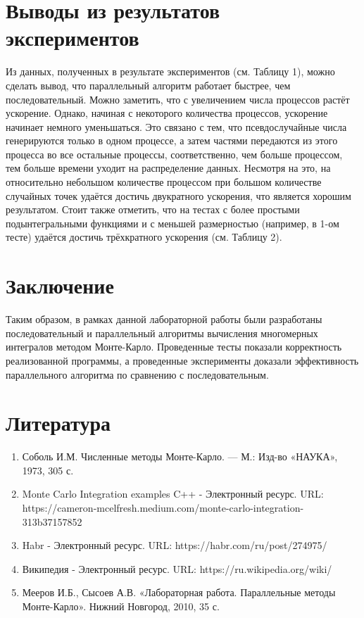\documentclass{report}
\begin{document}
\section*{Выводы из результатов экспериментов}
Из данных, полученных в результате экспериментов (см. Таблицу 1), можно сделать вывод, что параллельный алгоритм работает быстрее, чем последовательный. Можно заметить, что с увеличением числа процессов растёт ускорение. Однако, начиная с некоторого количества процессов, ускорение начинает немного уменьшаться. Это связано с тем, что псевдослучайные числа генерируются только в одном процессе, а затем частями передаются из этого процесса во все остальные процессы, соответственно, чем больше процессом, тем больше времени уходит на распределение данных. Несмотря на это, на относительно небольшом количестве процессом при большом количестве случайных точек удаётся достичь двукратного ускорения, что является хорошим результатом. Стоит также отметить, что на тестах с более простыми подынтегральными функциями и с меньшей размерностью (например, в 1-ом тесте) удаётся достичь трёхкратного ускорения (см. Таблицу 2).

\newpage

\section*{Заключение}
Таким образом, в рамках данной лабораторной работы были разработаны последовательный и параллельный алгоритмы вычисления многомерных интегралов методом Монте-Карло. Проведенные тесты показали корректность реализованной программы, а проведенные эксперименты доказали эффективность параллельного алгоритма по сравнению с последовательным.
\newpage

\section*{Литература}
\begin{enumerate}
\item Соболь И.М. Численные методы Монте-Карло. — М.: Изд-во «НАУКА», 1973, 305 с.
\item Monte Carlo Integration examples C++ - Электронный ресурс. \newline URL: https://cameron-mcelfresh.medium.com/monte-carlo-integration-313b37157852
\item Habr - Электронный ресурс. URL: https://habr.com/ru/post/274975/
\item Википедия - Электронный ресурс. URL: https://ru.wikipedia.org/wiki/%
\item Мееров И.Б., Сысоев А.В. «Лабораторная работа. Параллельные методы Монте-Карло». Нижний Новгород, 2010, 35 с. 
\end{enumerate} 
\newpage
\end{document}
